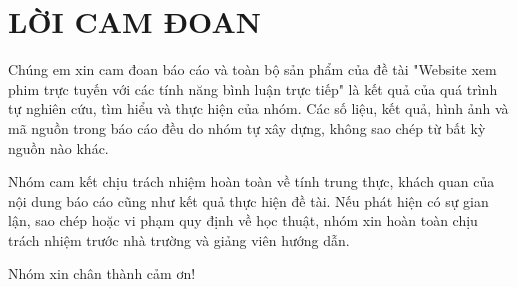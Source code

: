 
\newpage

\section{LỜI CAM ĐOAN}

Chúng em xin cam đoan báo cáo và toàn bộ sản phẩm của đề tài "Website xem phim trực tuyến với các tính năng bình luận trực tiếp" là kết quả của quá trình tự nghiên cứu, tìm hiểu và thực hiện của nhóm. Các số liệu, kết quả, hình ảnh và mã nguồn trong báo cáo đều do nhóm tự xây dựng, không sao chép từ bất kỳ nguồn nào khác.

Nhóm cam kết chịu trách nhiệm hoàn toàn về tính trung thực, khách quan của nội dung báo cáo cũng như kết quả thực hiện đề tài. Nếu phát hiện có sự gian lận, sao chép hoặc vi phạm quy định về học thuật, nhóm xin hoàn toàn chịu trách nhiệm trước nhà trường và giảng viên hướng dẫn.

Nhóm xin chân thành cảm ơn!
